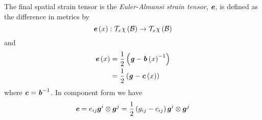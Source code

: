 The final spatial strain tensor is the \emph{Euler-Almansi strain tensor},
$\tensor{e}$, is defined as the difference in metrics
by
\begin{equation}
  \mapping{\fnof{\tensor{e}}{x}}{\tangentspace{\fnof{\chi}{\embedmanifold{B}}}{x}}{\tangentspace{\fnof{\chi}{\embedmanifold{B}}}{x}}
\end{equation}
and
\begin{equation}
  \begin{split}
    \fnof{\tensor{e}}{x}&=\frac{1}{2}\pbrac{\tensor{g}-\inverse{\fnof{\tensor{b}}{x}}}\\
    &= \frac{1}{2}\pbrac{\tensor{g}-\fnof{\tensor{c}}{x}}
  \end{split}
\end{equation}
where $\tensor{c}=\inverse{\tensor{b}}$. In component form we have
\begin{equation}
  \tensor{e}=e_{ij}\tensorprod{\vectr{g}^{i}}{\vectr{g}^{j}}=\frac{1}{2}\pbrac{g_{ij}-c_{ij}}\tensorprod{\vectr{g}^{i}}{\vectr{g}^{j}}
\end{equation}

